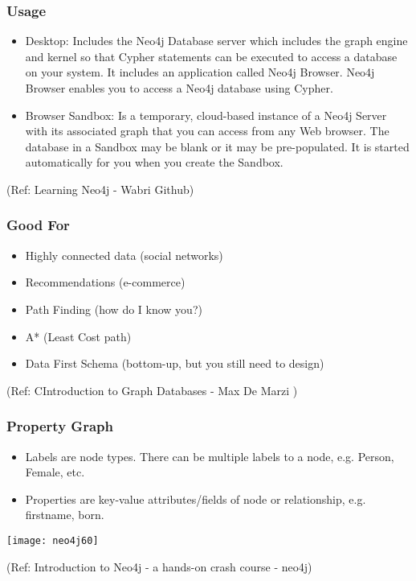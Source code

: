 \begin{frame}\frametitle{Usage }

\begin{itemize}
\item Desktop:  Includes the Neo4j Database server which includes the graph engine and kernel so that Cypher statements can be executed to access a database on your system. It includes an application called Neo4j Browser. Neo4j Browser enables you to access a Neo4j database using Cypher. 
\item Browser Sandbox: Is a temporary, cloud-based instance of a Neo4j Server with its associated graph that you can access from any Web browser. The database in a Sandbox may be blank or it may be pre-populated. It is started automatically for you when you create the Sandbox.
\end{itemize}


{\tiny (Ref: Learning Neo4j - Wabri Github)}
\end{frame}


\begin{frame}\frametitle{Good For}

\begin{itemize}
\item Highly connected data (social networks)
\item Recommendations (e-commerce)
\item Path Finding (how do I know you?)
\item A* (Least Cost path)
\item  Data First Schema (bottom-up, but you still need to design)
\end{itemize}

{\tiny (Ref: CIntroduction to Graph Databases - Max De Marzi )}
\end{frame}


\begin{frame}\frametitle{Property Graph}

\begin{itemize}
\item Labels are node types. There can be multiple labels to a node, e.g. Person, Female, etc.
\item Properties are key-value attributes/fields of node or relationship, e.g. firstname, born.

\end{itemize}
\begin{center}
\texttt{[image: neo4j60]}
\end{center}	

{\tiny (Ref: Introduction to Neo4j - a hands-on crash course - neo4j)}
\end{frame}


